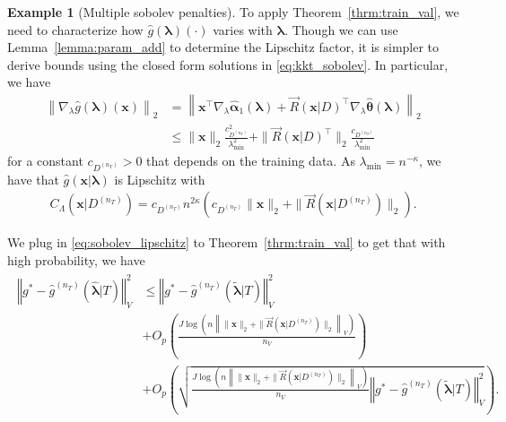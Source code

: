 \documentclass[12pt]{article} %
\theoremstyle{definition}
\newtheorem{example}{Example}
\begin{document}
\begin{example}[Multiple sobolev penalties]
	To apply Theorem~\ref{thrm:train_val}, we need to characterize how $\hat{g}(\boldsymbol{\lambda})(\cdot)$ varies with $\boldsymbol{\lambda}$.
	Though we can use Lemma~\ref{lemma:param_add} to determine the Lipschitz factor, it is simpler to derive bounds using the closed form solutions in \eqref{eq:kkt_sobolev}.
	In particular, we have
	\begin{align}
	\left \|
	\nabla_{\lambda} \hat{g}(\boldsymbol{\lambda})(\boldsymbol{x})
	\right \|_2
	& =
	\left \|
	\boldsymbol{x}^\top
	\nabla_{\lambda} \hat{\boldsymbol{\alpha}}_1(\boldsymbol{\lambda})
	+ \vec{R}(\boldsymbol{x} | D)^\top
	\nabla_{\lambda} \hat{\boldsymbol{\theta}}(\boldsymbol{\lambda})
	\right \|_2\\
	& \le
	\|\boldsymbol{x}\|_2
	\frac{c_{D^{(n_T)}}^2}{\lambda_{\min}^2}
	+ \|\vec{R}(\boldsymbol{x} | D)^\top\|_2
	\frac{c_{D^{(n_T)}}}{\lambda_{\min}^2}
	\end{align}
	for a constant $c_{D^{(n_T)}} > 0$ that depends on the training data.
	As $\lambda_{\min} = n^{-\kappa}$, we have that $\hat{g}(\boldsymbol{x}|\boldsymbol{\lambda})$ is Lipschitz with
	\begin{align}
	C_\Lambda(\boldsymbol{x} | D^{(n_T)})
	=
	c_{D^{(n_T)}}
	n^{2\kappa}
	\left(
	c_{D^{(n_T)}} \|\boldsymbol{x}\|_2
	+ \|\vec{R}(\boldsymbol{x}| D^{(n_T)}) \|_2
	\right).
	\label{eq:sobolev_lipschitz}
	\end{align}
	
	We plug in \eqref{eq:sobolev_lipschitz} to Theorem~\ref{thrm:train_val} to get that with high probability, we have
	\begin{align}
	\begin{split}
	\left\Vert g^* - \hat{g}^{(n_T)}( \hat{\boldsymbol{\lambda}} | T) \right\Vert _{V}^2
	&\le \left\Vert g^* - \hat{g}^{(n_T)}( \tilde{\boldsymbol{\lambda}} | T) \right \Vert^2_{V}\\
	& + O_p \left(\frac{J\log \left (n
		\left \|
		\|\boldsymbol{x}\|_2
		+ \|\vec{R}(\boldsymbol{x}| D^{(n_T)}) \|_2
		\right \|_V
		\right )}{n_{V}} \right)
	\\
	& + O_p \left(
	\sqrt{
		\frac{J\log \left (n
			\left \|
			\|\boldsymbol{x}\|_2
			+ \|\vec{R}(\boldsymbol{x}| D^{(n_T)}) \|_2
			\right \|_V
			\right )}{n_{V}}
		\left\Vert g^* - \hat{g}^{(n_T)}( \tilde{\boldsymbol{\lambda}}| T) \right \Vert^2_{V}
	}
	\right ).
	\end{split}
	\end{align}
\end{example}
\end{document}

